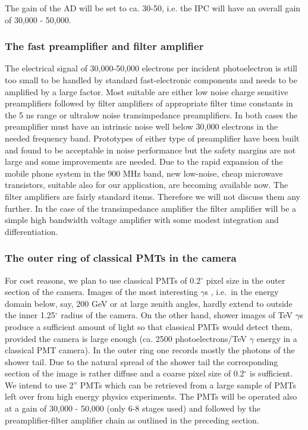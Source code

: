 The gain of the AD will be set to ca. 30-50, i.e. the IPC will have an
overall gain of 30,000 - 50,000.


\subsubsection{The fast preamplifier and filter amplifier}


\medskip The electrical signal of 30,000-50,000 electrons per
incident photoelectron is still too small to be handled by standard fast-electronic
components and needs to be amplified by a large factor. Most suitable are
either low noise charge sensitive preamplifiers followed by filter
amplifiers of appropriate filter time constants in the 5 ns range or
ultralow noise transimpedance preamplifiers. In both cases the preamplifier
must have an intrinsic noise well below 30,000 electrons in the needed
frequency band. Prototypes of either type of preamplifier have been built
and found to be acceptable in noise performance but the safety margins are
not large and some improvements are needed. Due to the rapid expansion of
the mobile phone system in the 900 MHz band, new low-noise, cheap microwave
transistors, suitable also for our application, are becoming available now.
The filter amplifiers are fairly standard items. Therefore we will not
discuss them any further. In the case of the transimpedance amplifier the
filter amplifier will be a simple high bandwidth voltage amplifier with some
modest integration and differentiation.

\subsubsection{The outer ring of classical PMTs in the camera}


\medskip For cost reasons, we plan to use classical PMTs of 0.2$^{\circ }$
pixel size in the outer section of the camera. Images of the most
interesting $\gamma $s , i.e.\ in the energy domain below, say, 200 GeV or at
large zenith angles, hardly extend to outside the inner 1.25$^{\circ }$ radius of
the camera. On the other hand, shower images of TeV $\gamma $s produce a
sufficient amount of light so that classical PMTs would detect them, provided
the camera is large enough (ca. 2500 photoelectrons/TeV $\gamma $ energy in
a classical PMT camera). In the outer ring one records mostly the photons of
the shower tail. Due to the natural spread of the shower tail the
corresponding section of the image is rather diffuse and a coarse pixel size
of 0.2$^{\circ }$ is sufficient. We intend to use 2'' PMTs
which can be retrieved from a large sample of PMTs left over from high energy
physics experiments. The PMTs will be operated also at a gain of 
\mbox{30,000} - \mbox{50,000}
(only 6-8 stages used) and followed by the preamplifier-filter amplifier chain as
outlined in the preceding section.

